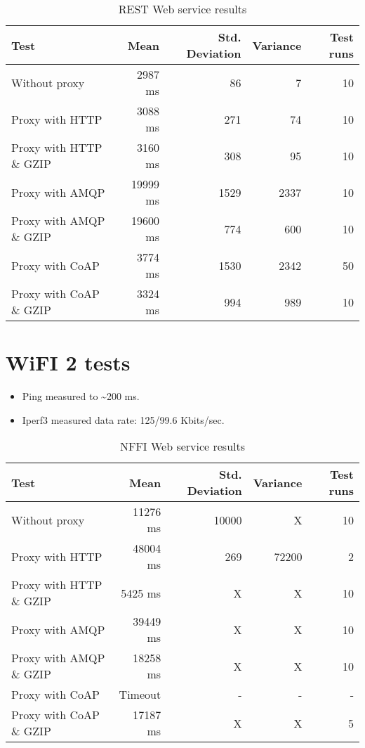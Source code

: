 \begin{appendices}
\begin{table}[H]
\begin{tabular}{| l | r | r | r | r |}
\hline
  \textbf{Test} & \textbf{Mean} & \textbf{Std. Deviation} & \textbf{Variance} & \textbf{Test runs}\\ \hline
  Without proxy & 2987 ms & 86 & 7 & 10 \\ \hline
  Proxy with HTTP & 3088 ms & 271 & 74 & 10 \\ \hline
  Proxy with HTTP \& GZIP & 3160 ms & 308 & 95 & 10 \\ \hline
  Proxy with AMQP & 19999 ms & 1529 & 2337 & 10 \\ \hline
  Proxy with AMQP \& GZIP & 19600 ms & 774 & 600 & 10\\ \hline
  Proxy with CoAP & 3774 ms & 1530 & 2342 & 50 \\ \hline
  Proxy with CoAP \& GZIP & 3324 ms & 994 & 989 & 10 \\ \hline
\end{tabular}
\caption{REST Web service results}
\end{table}




\section{WiFI 2 tests}

\begin{itemize}
	\item Ping measured to \textasciitilde 200 ms.
	\item Iperf3 measured data rate: 125/99.6 Kbits/sec.
\end{itemize}

\begin{table}[H]
\begin{tabular}{| l | r | r | r | r |}
\hline
  \textbf{Test} & \textbf{Mean} & \textbf{Std. Deviation} & \textbf{Variance} & \textbf{Test runs}\\ \hline
  Without proxy & 11276 ms & 10000 & X & 10 \\ \hline
  Proxy with HTTP & 48004 ms & 269 & 72200 & 2 \\ \hline
  Proxy with HTTP \& GZIP & 5425 ms & X & X & 10 \\ \hline
  Proxy with AMQP & 39449 ms & X & X & 10 \\ \hline
  Proxy with AMQP \& GZIP & 18258 ms & X & X & 10\\ \hline
  Proxy with CoAP & Timeout & - & - & - \\ \hline
  Proxy with CoAP \& GZIP & 17187 ms & X & X & 5 \\ \hline
\end{tabular}
\caption{NFFI Web service results}
\end{table}



\end{appendices}
